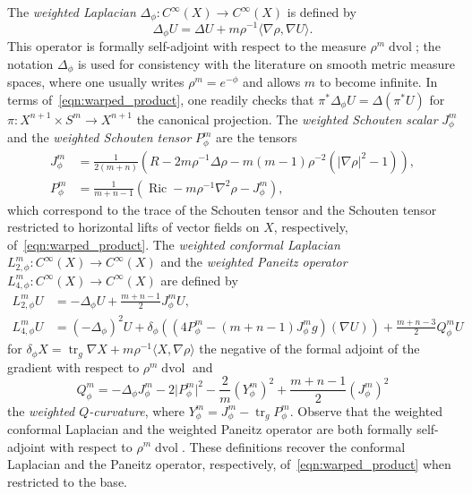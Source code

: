 \documentclass{amsart}
\theoremstyle{definition}
\theoremstyle{remark}
\numberwithin{equation}{section}
\begin{document}
The \emph{weighted Laplacian} $\Delta_\phi\colon C^\infty(X)\to C^\infty(X)$ is defined by
\[ \Delta_\phi U = \Delta U + m\rho^{-1}{\langle}\nabla\rho,\nabla U{\rangle} . \]
This operator is formally self-adjoint with respect to the measure $\rho^m\operatorname{dvol}$; the notation $\Delta_\phi$ is used for consistency with the literature on smooth metric measure spaces, where one usually writes $\rho^m=e^{-\phi}$ and allows $m$ to become infinite.  In terms of~\eqref{eqn:warped_product}, one readily checks that $\pi^\ast\Delta_\phi U = \Delta(\pi^\ast U)$ for $\pi\colon X^{n+1}\times S^m\to X^{n+1}$ the canonical projection.  The \emph{weighted Schouten scalar} $J_\phi^m$ and the \emph{weighted Schouten tensor} $P_\phi^m$ are the tensors
\begin{align*}
J_\phi^m & = \frac{1}{2(m+n)}\left(R - 2m\rho^{-1}\Delta\rho - m(m-1)\rho^{-2}\left({\lvert}\nabla\rho{\rvert}^2-1\right)\right), \\
P_\phi^m & = \frac{1}{m+n-1}\left(\operatorname{Ric} - m\rho^{-1}\nabla^2\rho - J_\phi^m\right),
\end{align*}
which correspond to the trace of the Schouten tensor and the Schouten tensor restricted to horizontal lifts of vector fields on $X$, respectively, of~\eqref{eqn:warped_product}.  The \emph{weighted conformal Laplacian} $L_{2,\phi}^m\colon C^\infty(X)\to C^\infty(X)$ and the \emph{weighted Paneitz operator} $L_{4,\phi}^m\colon C^\infty(X)\to C^\infty(X)$ are defined by
\begin{align*}
L_{2,\phi}^mU & = -\Delta_\phi U + \frac{m+n-1}{2}J_\phi^m U , \\
L_{4,\phi}^mU & = (-\Delta_\phi)^2U + \delta_\phi\left((4P_\phi^m-(m+n-1)J_\phi^mg)(\nabla U)\right) + \frac{m+n-3}{2}Q_\phi^mU
\end{align*}
for $\delta_\phi X=\operatorname{tr}_g\nabla X + m\rho^{-1}{\langle} X,\nabla\rho{\rangle}$ the negative of the formal adjoint of the gradient with respect to $\rho^m\operatorname{dvol}$ and
\[ Q_\phi^m = -\Delta_\phi J_\phi^m - 2{\lvert} P_\phi^m{\rvert}^2 - \frac{2}{m}\left(Y_\phi^m\right)^2 + \frac{m+n-1}{2}\left(J_\phi^m\right)^2 \]
the \emph{weighted $Q$-curvature}, where $Y_\phi^m=J_\phi^m-\operatorname{tr}_g P_\phi^m$.  Observe that the weighted conformal Laplacian and the weighted Paneitz operator are both formally self-adjoint with respect to $\rho^m\operatorname{dvol}$.  These definitions recover the conformal Laplacian and the Paneitz operator, respectively, of~\eqref{eqn:warped_product} when restricted to the base.
\end{document}

